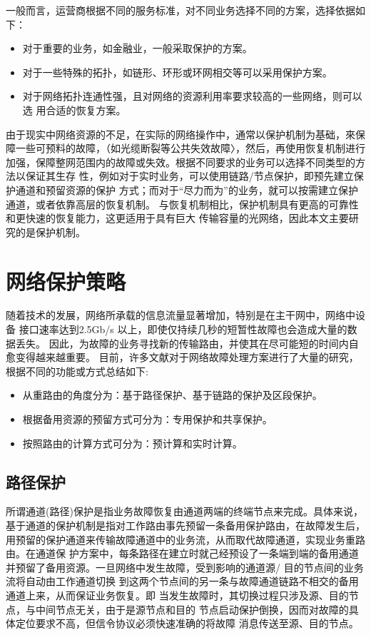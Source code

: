 一般而言，运营商根据不同的服务标准，对不同业务选择不同的方案，选择依据如下：
\begin{itemize}
  \item 对于重要的业务，如金融业，一般采取保护的方案。
  \item 对于一些特殊的拓扑，如链形、环形或环网相交等可以采用保护方案。
  \item 对于网络拓扑连通性强，且对网络的资源利用率要求较高的一些网络，则可以选
用合适的恢复方案。
\end{itemize}

由于现实中网络资源的不足，在实际的网络操作中，通常以保护机制为基础，來保 障一些可预料的故障，（如光缆断裂等公共失效故障〉，然后，再使用恢复机制进行加强，保障整网范围内的故障或失效。根据不同要求的业务可以选择不同类型的方法以保证其生存 性，例如对于实时业务，可以使用链路/节点保护，即预先建立保护通道和预留资源的保护 方式；而对于“尽力而为”的业务，就可以按需建立保护通道，或者依靠高层的恢复机制。 与恢复机制相比，保护机制具有更高的可靠性和更快速的恢复能力，这更适用于具有巨大 传输容量的光网络，因此本文主要研究的是保护机制。
\section{网络保护策略}
随着技术的发展，网络所承载的信息流量显著增加，特别是在主干网中，网络中设备 接口速率达到2.5Gb/s 以上，即使仅持续几秒的短暂性故障也会造成大量的数据丢失。 因此，为故障的业务寻找新的传输路由，并使其在尽可能短的时间内自愈变得越来越重要。 目前，许多文献对于网络故障处理方案进行了大量的研究，根据不同的功能或方式总结如下:
\begin{itemize}
  \item 从重路由的角度分为：基于路径保护、基于链路的保护及区段保护。
  \item 根据备用资源的预留方式可分为：专用保护和共享保护。
  \item 按照路由的计算方式可分为：预计算和实时计算。
\end{itemize}
\subsection{路径保护}
所谓通道(路径)保护是指业务故障恢复由通道两端的终端节点来完成。具体来说，基于通道的保护机制是指对工作路由事先预留一条备用保护路由，在故障发生后，用预留的保护通道来传输故障通道中的业务流，从而取代故障通道，实现业务重路由。在通道保 护方案中，每条路径在建立时就己经预设了一条端到端的备用通道并预留了备用资源。一旦网络中发生故障，受到影响的通道源/ 目的节点间的业务流将自动由工作通道切换 到这两个节点间的另一条与故障通道链路不相交的备用通道上来，从而保证业务恢复。即 当发生故障时，其切换过程只涉及源、目的节点，与中间节点无关，由于是源节点和目的 节点启动保护倒换，因而对故障的具体定位要求不高，但信令协议必须快速准确的将故障 消息传送至源、目的节点。


